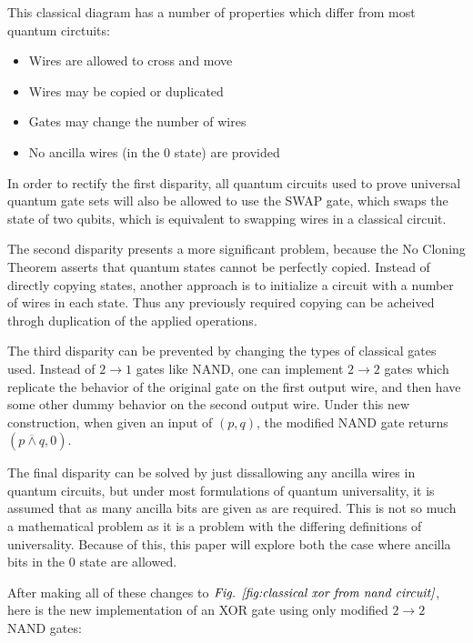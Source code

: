 \documentclass[12pt]{article}
\begin{document}
This classical diagram has a number of properties which differ from most quantum circtuits:
\begin{itemize}
    \item Wires are allowed to cross and move
    \item Wires may be copied or duplicated
    \item Gates may change the number of wires
    \item No ancilla wires (in the 0 state) are provided
\end{itemize}
In order to rectify the first disparity, all quantum circuits used to prove universal quantum gate sets will also be allowed to use the SWAP gate, which swaps the state of two qubits, which is equivalent to swapping wires in a classical circuit.

The second disparity presents a more significant problem, because the No Cloning Theorem asserts that quantum states cannot be perfectly copied. Instead of directly copying states, another approach is to initialize a circuit with a number of wires in each state. Thus any previously required copying can be acheived throgh duplication of the applied operations.

The third disparity can be prevented by changing the types of classical gates used. Instead of $2 \to 1$ gates like NAND, one can implement $2 \to 2$ gates which replicate the behavior of the original gate on the first output wire, and then have some other dummy behavior on the second output wire. Under this new construction, when given an input of $(p, q)$, the modified NAND gate returns $(p \overline{\land} q, 0)$.

The final disparity can be solved by just dissallowing any ancilla wires in quantum circuits, but under most formulations of quantum universality, it is assumed that as many ancilla bits are given as are required. This is not so much a mathematical problem as it is a problem with the differing definitions of universality. Because of this, this paper will explore both the case where ancilla bits in the 0 state are allowed.

After making all of these changes to $\emph{Fig. \ref{fig:classical xor from nand circuit}}$, here is the new implementation of an XOR gate using only modified $2 \to 2$ NAND gates:
\end{document}
